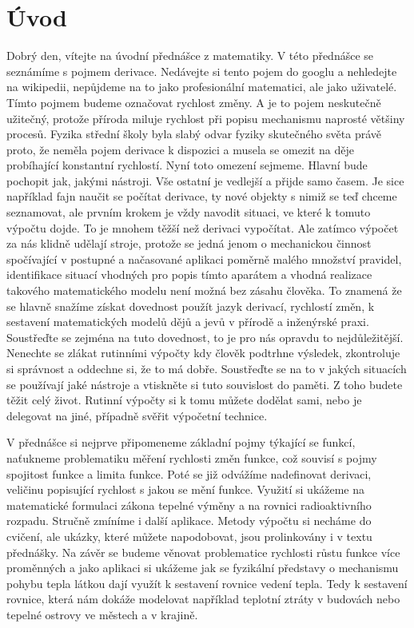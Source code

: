\documentclass[12pt]{article}
\begin{document}
\section*{Úvod}

Dobrý den, vítejte na úvodní přednášce z matematiky. V této přednášce se seznámíme s pojmem derivace. Nedávejte si tento pojem do googlu a nehledejte na wikipedii, nepůjdeme na to jako profesionální matematici, ale jako uživatelé. Tímto pojmem budeme označovat rychlost změny. A je to pojem neskutečně užitečný, protože příroda miluje rychlost při popisu mechanismu naprosté většiny procesů. Fyzika střední školy byla slabý odvar fyziky skutečného světa právě proto, že neměla pojem derivace k dispozici a musela se omezit na děje probíhající konstantní rychlostí. Nyní toto omezení sejmeme. Hlavní bude pochopit jak, jakými nástroji. Vše ostatní je vedlejší a přijde samo časem. Je sice například fajn naučit se počítat derivace, ty nové objekty s nimiž se teď chceme seznamovat, ale prvním krokem je vždy navodit situaci, ve které k tomuto výpočtu dojde. To je mnohem těžší než derivaci vypočítat. Ale zatímco výpočet za nás klidně udělají stroje, protože se jedná jenom o mechanickou činnost spočívající v postupné a načasované aplikaci poměrně malého množství pravidel, identifikace situací vhodných pro popis tímto aparátem a vhodná realizace takového matematického modelu není možná bez zásahu člověka. To znamená že se hlavně snažíme získat dovednost použít jazyk derivací, rychlostí změn, k sestavení matematických modelů dějů a jevů v přírodě a inženýrské praxi. Soustřeďte se zejména na tuto dovednost, to je pro nás opravdu to nejdůležitější. Nenechte se zlákat rutinními výpočty kdy člověk podtrhne výsledek, zkontroluje si správnost a oddechne si, že to má dobře. Soustřeďte se na to v jakých situacích se používají jaké nástroje a vtiskněte si tuto souvislost do paměti. Z toho budete těžit celý život. Rutinní výpočty si k tomu můžete dodělat sami, nebo je delegovat na jiné, případně svěřit výpočetní technice.

V přednášce si nejprve připomeneme základní pojmy týkající se funkcí, naťukneme problematiku měření rychlosti změn funkce, což souvisí s pojmy spojitost funkce  a limita funkce. Poté se již odvážíme nadefinovat derivaci, veličinu popisující rychlost s jakou se mění funkce. Využití si ukážeme na matematické formulaci zákona tepelné výměny a na rovnici radioaktivního rozpadu. Stručně zmíníme i další aplikace. Metody výpočtu si necháme do cvičení, ale ukázky, které můžete napodobovat, jsou prolinkovány i v textu přednášky. Na závěr se budeme věnovat problematice rychlosti růstu funkce více proměnných a jako aplikaci si ukážeme jak se fyzikální představy o mechanismu pohybu tepla látkou dají využít k sestavení rovnice vedení tepla. Tedy k sestavení rovnice, která nám dokáže modelovat například teplotní ztráty v budovách nebo tepelné ostrovy ve městech a v krajině. 
\end{document}
